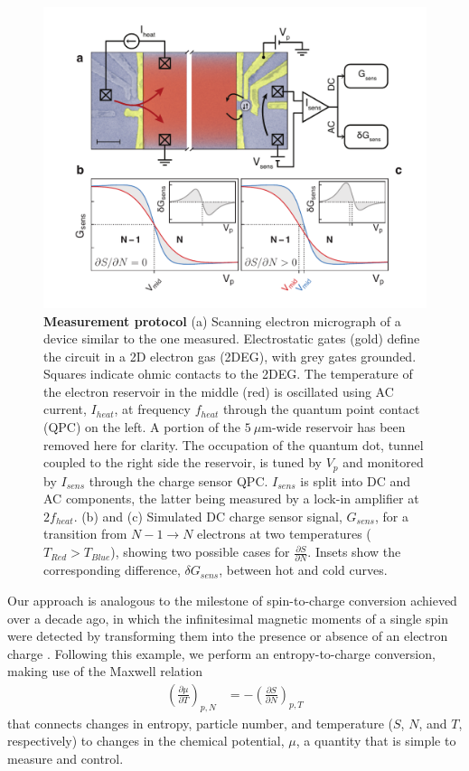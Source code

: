\documentclass[twocolumn,showpacs,amsmath,amssymb,prl,aps,superscriptaddress]{revtex4-1}
\begin{document}
\begin{figure}[!]
        \includegraphics[width=1.0\columnwidth]{../figures/figure_1_annotated.pdf}
        \caption{\label{fig:fig1} \textbf{Measurement protocol}  (a) Scanning electron micrograph of a device similar to the one measured. Electrostatic gates (gold) define the circuit in a 2D electron gas (2DEG), with grey gates grounded. Squares indicate ohmic contacts to the 2DEG.  The temperature of the electron reservoir in the middle (red) is oscillated using AC current, $I_{heat}$, at frequency $f_{heat}$ through the quantum point contact (QPC) on the left.  A portion of the $5~\mu$m-wide reservoir has been removed here for clarity.  The occupation of the quantum dot, tunnel coupled to the right side the reservoir, is tuned by $V_p$ and monitored by $I_{sens}$ through the charge sensor QPC. $I_{sens}$ is split into DC and AC components, the latter being measured by a lock-in amplifier at $2f_{heat}$.  (b) and (c) Simulated DC charge sensor signal, $G_{sens}$, for a transition from $N-1 \rightarrow N$ electrons at two temperatures ($T_{Red} > T_{Blue}$), showing two possible cases for $\frac{\partial S}{\partial N}$. Insets show the corresponding difference, $\delta G_{sens}$, between hot and cold curves.}
\end{figure}

Our approach is analogous to the milestone of spin-to-charge conversion achieved over a decade ago, in which the infinitesimal magnetic moments of a single spin were detected by transforming them into the presence or absence of an electron charge \cite{Elzerman2004, Ono2004}.  Following this example, we perform an entropy-to-charge conversion, making use of the Maxwell relation
%
\begin{align}
\label{eqn:max}
        \left(\frac{\partial \mu}{\partial T}\right)_{p,N} &= -\left(\frac{\partial S}{\partial N}\right)_{p,T}
\end{align}
%
that connects changes in entropy, particle number, and temperature ($S$, $N$, and $T$, respectively) to changes in the chemical potential, $\mu$, a quantity that is simple to measure and control. 
\end{document}
